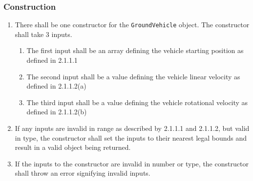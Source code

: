 \documentclass{article}
\begin{document}
\subsubsection{Construction}
\begin{enumerate}
	\item There shall be one constructor for the \verb|GroundVehicle| object.  The constructor shall take 3 inputs.
	\begin{enumerate}
		\item The first input shall be an array defining the vehicle starting position as defined in 2.1.1.1
		\item The second input shall be a value defining the vehicle linear velocity as defined in 2.1.1.2(a)
		\item The third input shall be a value defining the vehicle rotational velocity as defined in 2.1.1.2(b)
	\end{enumerate}
	\item If any inputs are invalid in range as described by 2.1.1.1 and 2.1.1.2, but valid in type, the constructor shall set the inputs to their nearest legal bounds and result in a valid object being returned.
	\item If the inputs to the constructor are invalid in number or type, the constructor shall throw an error signifying invalid inputs.
\end{enumerate}
\end{document}

